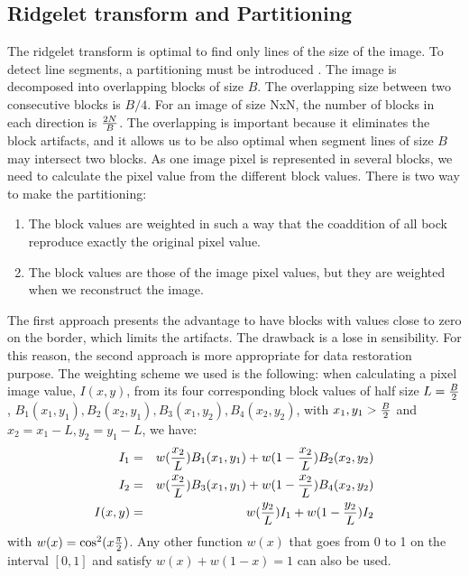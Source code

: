 \documentclass{article}
\begin{document}
\subsection{Ridgelet transform and Partitioning}
The ridgelet transform is optimal to find only lines of the size 
of the image. To detect line segments, a partitioning must be
introduced \cite{cur:candes98}.  The image is decomposed 
into overlapping blocks
of size $B$. The overlapping size between two consecutive blocks
is $B/4$. For an image of size NxN, the number of blocks 
in each direction is ${2N \over B}$. The overlapping is important
because it eliminates the block artifacts, and it allows us to be 
also optimal when segment lines of size $B$ may 
intersect two blocks. 
As one image pixel is represented in several blocks, we need
to calculate the pixel value from the different block values. 
There is two way to make the partitioning:
\begin{enumerate}
\item The block values are weighted in such a way that the coaddition 
of all bock reproduce exactly the original pixel value.
\item The block values are those of the image pixel values, but they are weighted
when we reconstruct the image.
\end{enumerate}
The first approach presents the advantage to have blocks with values close 
to zero on the border, which limits the artifacts. The drawback is 
a lose in sensibility. For this reason, the second approach 
is more appropriate for data restoration purpose.
The weighting scheme we used is the following: when 
calculating a pixel image value, $I(x,y)$, from its four corresponding block
values of half size $L={B \over 2}$, 
$B_1(x_1,y_1),B_2(x_2,y_1),B_3(x_1,y_2),B_4(x_2,y_2)$, with
$x_1,y_1 > {B \over 2}$ and $x_2 = x_1-L, y_2=y_1-L$, we have:
\begin{eqnarray}
I_1 &  = &  w({x_2\over L}) B_1(x_1,y_1) + w(1-{x_2\over L}) B_2(x_2,y_2)  \nonumber \\
I_2 &  = &  w({x_2\over L}) B_3(x_1,y_1) + w(1-{x_2\over L}) B_4(x_2,y_2)  \nonumber \\
I(x,y) &  = &  w({y_2\over L}) I_1 +  w(1-{y_2\over L}) I_2  \\
\end{eqnarray}
with $w(x) = {\cos}^2( x {\pi \over 2})$.
Any other function $w(x) $ that goes from 0 to 1 on the interval $[0,1]$ and 
satisfy $w(x) + w(1-x) = 1$ can also be used.
\end{document}
